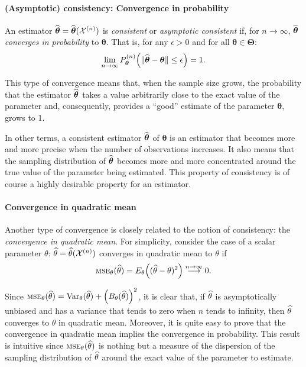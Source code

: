 \paragraph{(Asymptotic) consistency: Convergence in probability}

An estimator $\widehat{\boldsymbol\theta} =
\widehat{\boldsymbol\theta}(\mathcal{X}^{(n)})$ is \emph{consistent} or
\emph{asymptotic consistent} if, for $n \rightarrow \infty$,
$\widehat{\boldsymbol\theta}$ \emph{converges in probability} to
$\boldsymbol\theta$. That is, for any $\epsilon > 0$ and for all
$\boldsymbol\theta \in \boldsymbol\Theta$:
\begin{equation}
    \lim_{n \rightarrow \infty} P_{\boldsymbol\theta}^{(n)} \left(
        \Vert\sthat{\boldsymbol\theta} - \boldsymbol\theta \Vert \leq \epsilon
        \right) = 1. \label{eq:consistency}
\end{equation}

This type of convergence means that, when the sample size grows, the
probability that the estimator $\widehat{\boldsymbol\theta}$ takes a value
arbitrarily close to the exact value of the parameter and, consequently,
provides a “good” estimate of the parameter $\boldsymbol\theta$, grows to 1.

In other terms, a consistent estimator $\widehat{\boldsymbol\theta}$ of
$\boldsymbol\theta$ is an estimator that becomes more and more precise when the
number of observations increases. It also means that the sampling distribution
of $\widehat{\boldsymbol\theta}$ becomes more and more concentrated around the
true value of the parameter being estimated. This property of consistency is of
course a highly desirable property for an estimator.

\paragraph{Convergence in quadratic mean}

Another type of convergence is closely related to the notion of consistency:
the \emph{convergence in quadratic mean}. For simplicity, consider the case of
a scalar parameter $\theta$: $\widehat{\theta}=\widehat{\theta}({\cal X}^{(n)})$
converges in quadratic mean to $\theta$ if
\[
    \stsc{MSE}_{\theta}(\sthat{\theta})=E_{\theta}\left((\sthat{\theta}-\theta)^2\right) 
    \stackrel{n \rightarrow \infty}{\longrightarrow} 0.
\]

Since $\stsc{MSE}_{\theta}(\sthat{\theta})={\rm Var}_{\theta}(\sthat{\theta}) +
\left(B_{\theta}(\sthat{\theta})\right)^2$, it is clear that, if
$\widehat{\theta}$ is asymptotically unbiased and has a variance that tends to
zero when $n$ tends to infinity, then $\widehat{\theta}$ converges to $\theta$ in
quadratic mean. Moreover, it is quite easy to prove that the convergence in
quadratic mean implies the convergence in probability. This result is intuitive
since $\stsc{MSE}_{\theta}(\sthat{\theta})$ is nothing but a measure of the
dispersion of the sampling distribution of $\widehat{\theta}$ around the exact
value of the parameter to estimate.

